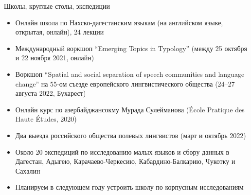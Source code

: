 \documentclass[
  13pt,
  ignorenonframetext,
]{beamer}
\providecommand{\tightlist}{%
  \setlength{\itemsep}{0pt}\setlength{\parskip}{0pt}}
\begin{document}
\begin{frame}{Школы, круглые столы, экспедиции}
\protect\hypertarget{ux448ux43aux43eux43bux44b-ux43aux440ux443ux433ux43bux44bux435-ux441ux442ux43eux43bux44b-ux44dux43aux441ux43fux435ux434ux438ux446ux438ux438}{}
\begin{itemize}
\tightlist
\item
  Онлайн школа по Нахско-дагестанским языкам (на английском языке,
  открытая, онлайн), 24 лекции
\item
  Международный воркшоп ``Emerging Topics in Typology'' (между 25
  октября и 22 ноября 2021, онлайн)
\item
  Воркшоп ``Spatial and social separation of speech communities and
  language change'' на 55-ом съезде европейского лингвистического
  общества (24--27 августа 2022, Бухарест)
\item
  Онлайн курс по азербайджансокму Мурада Сулейманова (École Pratique des
  Haute Études, 2020)
\item
  Два выезда российского общества полевых лингвистов (март и октябрь
  2022)
\item
  Около 20 экспедиций по исследованию малых языков и сбору данных в
  Дагестан, Адыгею, Карачаево-Черкесию, Кабардино-Балкарию, Чукотку и
  Сахалин \pause
\item
  Планируем в следующем году устроить школу по корпусным исследованиям
\end{itemize}
\end{frame}
\end{document}

